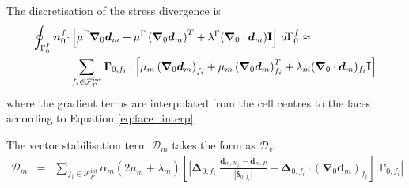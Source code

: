 \documentclass[sn-mathphys,Numbered]{sn-jnl}%
\newcommand{\bb}{\boldsymbol}
\begin{document}
The discretisation of the stress divergence is
\begin{align}
    \oint_{\Gamma_0^f} \bb{n}_0^f \cdot
    &\left[
    \mu^\Gamma \bb{\nabla}_0 \bb{d}_m + \mu^\Gamma \left(\bb{\nabla}_0 \bb{d}_m \right)^T
    + \lambda^\Gamma (\bb{\nabla}_0 \cdot \bb{d}_m) \textbf{I}
    \right]    \, d\Gamma_0^f
	\approx \notag \\
	&\sum_{f_i \in \mathcal{F}_P^{\text{int}}}
	\bb{\Gamma}_{0,f_i}
	\cdot
	\left[
	\mu_m \left(\bb{\nabla}_0 \bb{d}_m\right)_{f_i} + \mu_m \left(\bb{\nabla}_0 \bb{d}_m \right)^T_{f_i}
    + \lambda_m (\bb{\nabla}_0 \cdot \bb{d}_m)_{f_i} \textbf{I}
	\right]
\end{align}
where the gradient terms are interpolated from the cell centres to the faces according to Equation \ref{eq:face_interp}.

The vector stabilisation term $\bb{\mathcal{D}}_m$ takes the form as $\bb{\mathcal{D}}_v$:
\begin{eqnarray}
	\bb{\mathcal{D}}_m
	&=& \sum_{f_i \in \mathcal{F}^{\text{int}}_P} \alpha_m (2\mu_m + \lambda_m) \left[
		\left|\bb{\Delta}_{0,f_i} \right| \frac{ \bb{d}_{m,N_{f_i}} - \bb{d}_{m,P}}{\left|\bb{\delta}_{0,f_i}\right|}	- \bb{\Delta}_{0,f_i} \cdot \left(\bb{\nabla}_0 \bb{d}_m \right)_{f_i}
		\right]    \left|\bb{\Gamma}_{0,f_i}\right|
\end{eqnarray}
\end{document}
